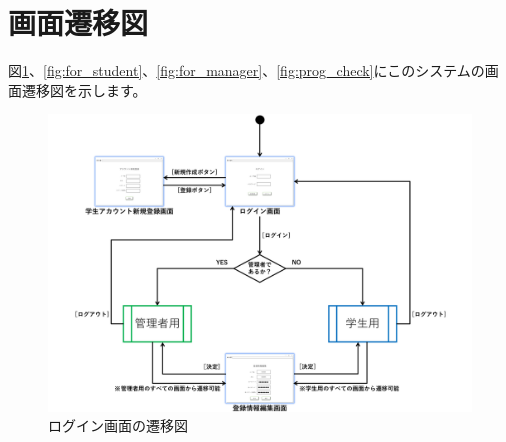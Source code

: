 \section{画面遷移図}
図\ref{fig:login}、\ref{fig:for_student}、\ref{fig:for_manager}、\ref{fig:prog_check}にこのシステムの画面遷移図を示します。

\begin{figure}[htbp]
  \begin{center}
    \includegraphics[width=1\linewidth,clip]{./img/login.png}
    \caption{ログイン画面の遷移図}\label{fig:login}
  \end{center}
\end{figure}

